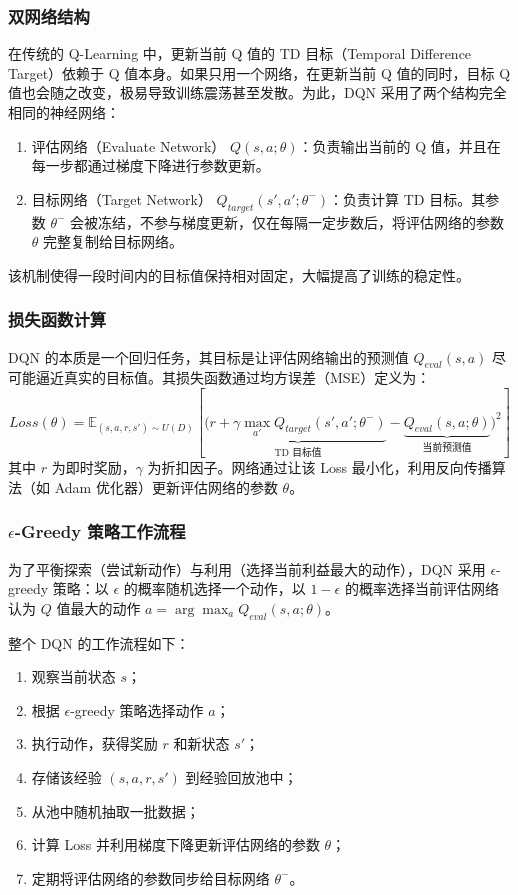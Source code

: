 \documentclass[
  oneside,
  degree=bachelor,
  fullwidthstop=false,
  fontset=fandol,
  times=false,
  minted=true,
  biblatex=true,
]{tongjithesis}
\begin{document}
\subsubsection{双网络结构}
在传统的 Q-Learning 中，更新当前 Q 值的 TD 目标（Temporal Difference Target）依赖于 Q 值本身。如果只用一个网络，在更新当前 Q 值的同时，目标 Q 值也会随之改变，极易导致训练震荡甚至发散。为此，DQN 采用了两个结构完全相同的神经网络：
\begin{enumerate}
    \item 评估网络（Evaluate Network） $Q(s, a; \theta)$：负责输出当前的 Q 值，并且在每一步都通过梯度下降进行参数更新。
    \item 目标网络（Target Network） $Q_{target}(s', a'; \theta^-)$：负责计算 TD 目标。其参数 $\theta^-$ 会被冻结，不参与梯度更新，仅在每隔一定步数后，将评估网络的参数 $\theta$ 完整复制给目标网络。
\end{enumerate}

该机制使得一段时间内的目标值保持相对固定，大幅提高了训练的稳定性。

\subsubsection{损失函数计算}
DQN 的本质是一个回归任务，其目标是让评估网络输出的预测值 $Q_{eval}(s, a)$ 尽可能逼近真实的目标值。其损失函数通过均方误差（MSE）定义为：
\begin{equation}
    Loss(\theta) = \mathbb{E}_{(s,a,r,s') \sim U(D)} \left[ \Big( \underbrace{r + \gamma \max_{a'} Q_{target}(s', a'; \theta^-)}_{\text{TD 目标值}} - \underbrace{Q_{eval}(s, a; \theta)}_{\text{当前预测值}} \Big)^2 \right]
\end{equation}
其中 $r$ 为即时奖励，$\gamma$ 为折扣因子。网络通过让该 Loss 最小化，利用反向传播算法（如 Adam 优化器）更新评估网络的参数 $\theta$。

\subsubsection{$\epsilon$-Greedy 策略工作流程}
为了平衡探索（尝试新动作）与利用（选择当前利益最大的动作），DQN 采用 $\epsilon$-greedy 策略：以 $\epsilon$ 的概率随机选择一个动作，以 $1 - \epsilon$ 的概率选择当前评估网络认为 $Q$ 值最大的动作 $a = \arg\max_{a} Q_{eval}(s, a; \theta)$。

整个 DQN 的工作流程如下：
\begin{enumerate}
    \item 观察当前状态 $s$；
    \item 根据 $\epsilon$-greedy 策略选择动作 $a$；
    \item 执行动作，获得奖励 $r$ 和新状态 $s'$；
    \item 存储该经验 $(s, a, r, s')$ 到经验回放池中；
    \item 从池中随机抽取一批数据；
    \item 计算 Loss 并利用梯度下降更新评估网络的参数 $\theta$；
    \item 定期将评估网络的参数同步给目标网络 $\theta^-$。
\end{enumerate}
\end{document}
